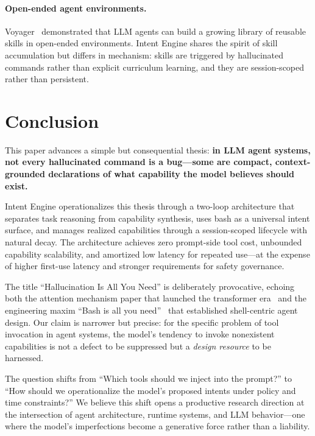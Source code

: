 \documentclass[11pt]{article}
\begin{document}
\paragraph{Open-ended agent environments.}
Voyager~\citep{wang2023voyager} demonstrated that LLM agents can build a growing library of reusable skills in open-ended environments. Intent Engine shares the spirit of skill accumulation but differs in mechanism: skills are triggered by hallucinated commands rather than explicit curriculum learning, and they are session-scoped rather than persistent.

\section{Conclusion}
\label{sec:conclusion}

This paper advances a simple but consequential thesis: \textbf{in LLM agent systems, not every hallucinated command is a bug---some are compact, context-grounded declarations of what capability the model believes should exist.}

Intent Engine operationalizes this thesis through a two-loop architecture that separates task reasoning from capability synthesis, uses bash as a universal intent surface, and manages realized capabilities through a session-scoped lifecycle with natural decay.
The architecture achieves zero prompt-side tool cost, unbounded capability scalability, and amortized low latency for repeated use---at the expense of higher first-use latency and stronger requirements for safety governance.

The title ``Hallucination Is All You Need'' is deliberately provocative, echoing both the attention mechanism paper that launched the transformer era~\citep{vaswani2017attention} and the engineering maxim ``Bash is all you need''~\citep{shihipar2026bash} that established shell-centric agent design.
Our claim is narrower but precise: for the specific problem of tool invocation in agent systems, the model's tendency to invoke nonexistent capabilities is not a defect to be suppressed but a \emph{design resource} to be harnessed.

The question shifts from ``Which tools should we inject into the prompt?'' to ``How should we operationalize the model's proposed intents under policy and time constraints?''
We believe this shift opens a productive research direction at the intersection of agent architecture, runtime systems, and LLM behavior---one where the model's imperfections become a generative force rather than a liability.
\end{document}
